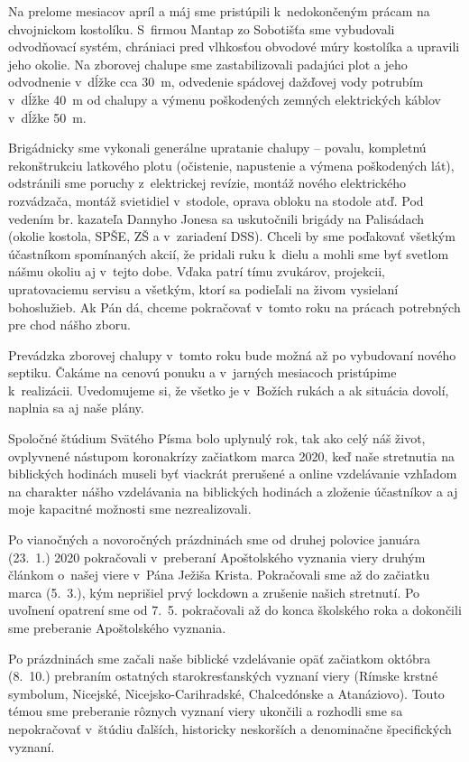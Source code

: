 Na prelome mesiacov apríl a máj sme pristúpili k~nedokončeným prácam na chvojnickom kostolíku. S~firmou Mantap zo Sobotišťa sme vybudovali odvodňovací systém, chrániaci pred vlhkosťou obvodové múry kostolíka a upravili jeho okolie. Na zborovej chalupe sme zastabilizovali padajúci plot a jeho odvodnenie v~dĺžke cca 30~m, odvedenie spádovej dažďovej vody potrubím v~dĺžke 40~m od chalupy a výmenu poškodených zemných elektrických káblov v~dĺžke 50~m.

Brigádnicky sme vykonali generálne upratanie chalupy -- povalu, kompletnú rekonštrukciu latkového plotu (očistenie, napustenie a výmena poškodených lát), odstránili sme poruchy z~elektrickej revízie, montáž nového elektrického rozvádzača, montáž svietidiel v~stodole, oprava obloku na stodole atď. Pod vedením br. kazateľa Dannyho Jonesa sa uskutočnili brigády na Palisádach (okolie kostola, SPŠE, ZŠ a v~zariadení DSS). Chceli by sme poďakovať všetkým účastníkom spomínaných akcií, že pridali ruku k~dielu a mohli sme byť svetlom nášmu okoliu aj v~tejto dobe. Vďaka patrí tímu zvukárov, projekcii, upratovaciemu servisu a všetkým, ktorí sa podieľali na živom vysielaní bohoslužieb. Ak Pán dá, chceme pokračovať v~tomto roku na prácach potrebných pre chod nášho zboru.

Prevádzka zborovej chalupy v~tomto roku bude možná až po vybudovaní nového septiku. Čakáme na cenovú ponuku a v~jarných mesiacoch pristúpime k~realizácii. Uvedomujeme si, že všetko je v~Božích rukách a ak situácia dovolí, naplnia sa aj naše plány.



Spoločné štúdium Svätého Písma bolo uplynulý rok, tak ako celý náš život, ovplyvnené nástupom koronakrízy začiatkom marca 2020, keď naše stretnutia na biblických hodinách museli byť viackrát prerušené a online vzdelávanie vzhľadom na charakter nášho vzdelávania na biblických hodinách a zloženie účastníkov a aj moje kapacitné možnosti sme nezrealizovali.

Po vianočných a novoročných prázdninách sme od druhej polovice januára (23.~1.) 2020 pokračovali v~preberaní Apoštolského vyznania viery druhým článkom o~našej viere v~Pána Ježiša Krista. Pokračovali sme až do začiatku marca (5.~3.), kým neprišiel prvý lockdown a zrušenie našich stretnutí.  Po uvoľnení opatrení sme od 7.~5. pokračovali až do konca školského roka a dokončili sme preberanie Apoštolského vyznania.

Po prázdninách sme začali naše biblické vzdelávanie opäť začiatkom októbra (8.~10.) prebraním ostatných starokresťanských vyznaní viery (Rímske krstné symbolum, Nicejské, Nicejsko-Carihradské, Chalcedónske a Atanáziovo). Touto témou sme preberanie rôznych vyznaní viery ukončili a rozhodli sme sa nepokračovať v~štúdiu ďalších, historicky neskorších a denominačne špecifických vyznaní.

